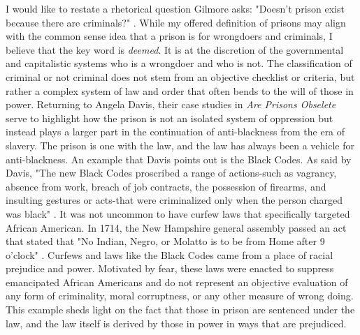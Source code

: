 I would like to restate a rhetorical question Gilmore asks: "Doesn't prison exist because there are criminals?" \cite*[12]{gilmoreGoldenGulagPrisons2007}. While my offered definition of prisons may align with the common sense idea that a prison is for wrongdoers and criminals, I believe that the key word is \textit{deemed}. It is at the discretion of the governmental and capitalistic systems who is a wrongdoer and who is not. The classification of criminal or not criminal does not stem from an objective checklist or criteria, but rather a complex system of law and order that often bends to the will of those in power. Returning to Angela Davis, their case studies in \textit{Are Prisons Obselete} serve to highlight how the prison is not an isolated system of oppression but instead plays a larger part in the continuation of anti-blackness from the era of slavery. The prison is one with the law, and the law has always been a vehicle for anti-blackness. An example that Davis points out is the Black Codes. As said by Davis, "The new Black Codes proscribed a range of actions-such as vagrancy, absence from work, breach of job contracts, the possession of firearms, and insulting gestures or acts-that were criminalized only when the person charged was black" \cite*[28]{davisArePrisonsObsolete2003}. It was not uncommon to have curfew laws that specifically targeted African American. In 1714, the New Hampshire general assembly passed an act that stated that "No Indian, Negro, or Molatto is to be from Home after 9 o'clock" \cite{marksammonsBlackPortsmouth2004}. Curfews and laws like the Black Codes came from a place of racial prejudice and power. Motivated by fear, these laws were enacted to suppress emancipated African Americans and do not represent an objective evaluation of any form of criminality, moral corruptness, or any other measure of wrong doing. This example sheds light on the fact that those in prison are sentenced under the law, and the law itself is derived by those in power in ways that are prejudiced.


